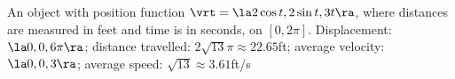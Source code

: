 {An object with position function $\vrt = \la 2\cos t,2\sin t, 3t\ra$, where distances are measured in feet and time is in seconds, on $[0,2\pi]$.
}
{Displacement: $\la 0,0,6\pi\ra$; distance travelled: $2\sqrt{13}\pi \approx 22.65$ft; average velocity: $\la 0,0,3\ra$; average speed: $\sqrt{13} \approx 3.61$ft/s
}